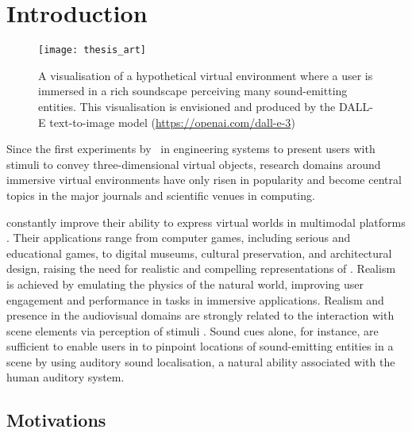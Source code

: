 \chapter{Introduction}\label{ch:introduction}


\begin{figure}[tbp]
    \centering
    \texttt{[image: thesis\_art]}
    \caption[Hypothetical virtual environment with a rich soundscape]{A visualisation of a hypothetical virtual environment where a user is immersed in a rich soundscape perceiving many sound-emitting entities. This visualisation is envisioned and produced by the DALL-E text-to-image model (\url{https://openai.com/dall-e-3})}
\end{figure}

Since the first experiments by~\cite{sutherland1968head} in engineering systems to present users with stimuli to convey three-dimensional virtual objects, research domains around immersive virtual environments have only risen in popularity and become central topics in the major journals and scientific venues in computing.\par
{} constantly improve their ability to express virtual worlds in multimodal platforms \citep{rubio2017immersive}. Their applications range from computer games, including serious and educational games, to digital museums, cultural preservation, and architectural design, raising the need for realistic and compelling representations of . Realism is achieved by emulating the physics of the natural world, improving user engagement and performance in tasks in immersive applications. Realism and presence in the audiovisual domains are strongly related to the interaction with scene elements via perception of stimuli \citep{zimmons2003influence, lokki2005navigation}. Sound cues alone, for instance, are sufficient to enable users in  to pinpoint locations of sound-emitting entities in a scene by using auditory sound localisation, a natural ability associated with the human auditory system.\par
\section{Motivations}
